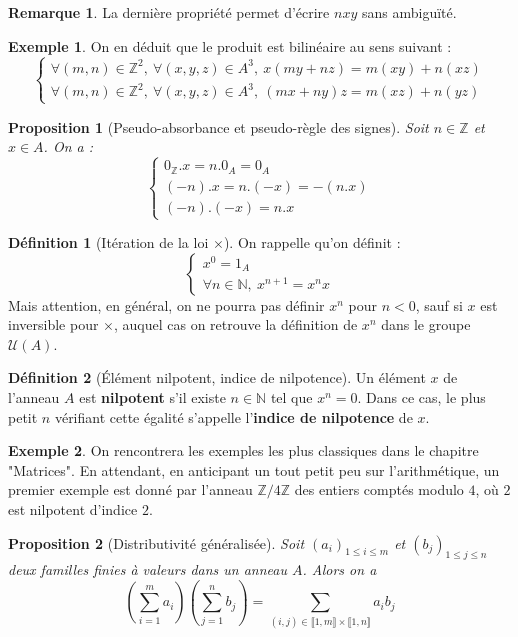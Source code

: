 \documentclass[french]{book}
\newcommand{\N}{\mathbb{N}}
\newcommand{\Z}{\mathbb{Z}}
\theoremstyle{plain}
\newtheorem{prop}{Proposition}[chapter]
\theoremstyle{definition}
\newtheorem{dfn}{Définition}[chapter]
\newtheorem{exa}{Exemple}[chapter]
\newtheorem{rmq}{Remarque}[chapter]
\theoremstyle{remark}
\begin{document}
\begin{rmq}
	La dernière propriété permet d'écrire $nxy$ sans ambiguïté.
\end{rmq}
\begin{exa}
	On en déduit que le produit est bilinéaire au sens suivant : $$\left \{\begin{array}{ll}\forall(m,n)\in\Z^2,\ \forall(x,y,z)\in A^3,\ x(my+nz)=m(xy)+n(xz)\\ \forall(m,n)\in\Z^2,\ \forall(x,y,z)\in A^3,\ (mx+ny)z=m(xz)+n(yz)\end{array}\right.$$
\end{exa}
\begin{prop}[Pseudo-absorbance et pseudo-règle des signes]
	Soit $n\in\Z$ et $x\in A$. On a : $$\left \{\begin{array}{lll}0_\Z. x=n.0_A=0_A \\ (-n).x=n.(-x)=-(n.x)\\ (-n).(-x)=n.x\end{array}\right.$$
\end{prop}
\begin{dfn}[Itération de la loi $\times$]
	On rappelle qu'on définit : $$\left \{\begin{array}{ll}x^0=1_A \\ \forall n\in\N,\ x^{n+1}=x^nx\end{array}\right.$$ Mais attention, en général, on ne pourra pas définir $x^n$ pour $n<0$, sauf si $x$ est inversible pour $\times$, auquel cas on retrouve la définition de $x^n$ dans le groupe $\mathcal{U}(A)$.
\end{dfn}
\begin{dfn}[Élément nilpotent, indice de nilpotence]
	Un élément $x$ de l'anneau $A$ est \textbf{nilpotent} s'il existe $n\in\N$ tel que $x^n=0$. Dans ce cas, le plus petit $n$ vérifiant cette égalité s'appelle l'\textbf{indice de nilpotence} de $x$.
\end{dfn}
\begin{exa}
	On rencontrera les exemples les plus classiques dans le chapitre "Matrices". En attendant, en anticipant un tout petit peu sur l'arithmétique, un premier exemple est donné par l'anneau $\Z/4\Z$ des entiers comptés modulo $4$, où $2$ est nilpotent d'indice $2$.
\end{exa}
\begin{prop}[Distributivité généralisée]
	Soit $(a_i)_{1\leqslant i\leqslant m}$ et $(b_j)_{1\leqslant j\leqslant n}$ deux familles finies à valeurs dans un anneau $A$. Alors on a $$\left(\sum_{i=1}^{m}a_i\right)\left(\sum_{j=1}^{n}b_j\right)=\sum_{(i,j)\in\llbracket1,m\rrbracket\times\llbracket1,n\rrbracket}a_ib_j$$
\end{prop}
\end{document}

